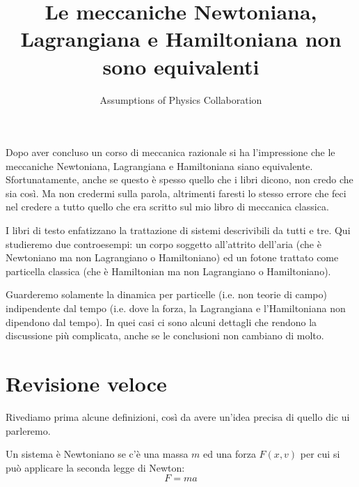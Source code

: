 \documentclass[11pt]{article}
\begin{document}
	

\title{Le meccaniche Newtoniana, Lagrangiana e Hamiltoniana non sono equivalenti}
\author{Assumptions of Physics Collaboration}

\date{}

\maketitle

Dopo aver concluso un corso di meccanica razionale si ha l'impressione che le meccaniche Newtoniana, Lagrangiana e Hamiltoniana siano equivalente. Sfortunatamente, anche se questo \`e spesso quello che i libri dicono, non credo che sia cos\`i. Ma non credermi sulla parola, altrimenti faresti lo stesso errore che feci nel credere a tutto quello che era scritto sul mio libro di meccanica classica.

I libri di testo enfatizzano la trattazione di sistemi descrivibili da tutti e tre. Qui studieremo due controesempi: un corpo soggetto all'attrito dell'aria (che \`e Newtoniano ma non Lagrangiano o Hamiltoniano) ed un fotone trattato come particella classica (che \`e Hamiltonian ma non Lagrangiano o Hamiltoniano).

Guarderemo solamente la dinamica per particelle (i.e. non teorie di campo) indipendente dal tempo (i.e. dove la forza, la Lagrangiana e l'Hamiltoniana non dipendono dal tempo). In quei casi ci sono alcuni dettagli che rendono la discussione pi\`u complicata, anche se le conclusioni non cambiano di molto.

\section{Revisione veloce}

Rivediamo prima alcune definizioni, cos\`i da avere un'idea precisa di quello dic ui parleremo.

Un sistema \`e Newtoniano se c'\`e una massa $m$ ed una forza $F(x,v)$ per cui si pu\`o applicare la seconda legge di Newton:
\begin{equation}
\label{Fma}
F=ma
\end{equation}
\end{document}
